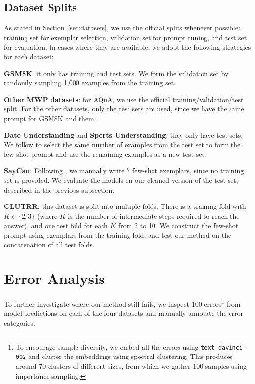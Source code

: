 \documentclass[11pt]{article}
\begin{document}
\subsection{Dataset Splits}
As stated in Section~\ref{sec:datasets}, we use the official splits whenever possible: training set for exemplar selection, validation set for prompt tuning, and test set for evaluation. In cases where they are available, we adopt the following strategies for each dataset:

\textbf{GSM8K}: it only has training and test sets. We form the validation set by randomly sampling 1,000 examples from the training set.

\textbf{Other MWP datasets}: for AQuA, we use the official training/validation/test split. For the other datasets, only the test sets are used, since we have the same prompt for GSM8K and them.

\textbf{Date Understanding} and \textbf{Sports Understanding}: they only have test sets. We follow \citet{wei_chain_2022} to select the same number of examples from the test set to form the few-shot prompt and use the remaining examples as a new test set. 

\textbf{SayCan}: Following \citet{wei_chain_2022}, we manually write 7 few-shot exemplars, since no training set is provided. We evaluate the models on our cleaned version of the test set, described in the previous subsection.

\textbf{CLUTRR}: this dataset is split into multiple folds. There is a training fold with $K \in \{2,3\}$ (where $K$ is the number of intermediate steps required to reach the answer), and one test fold for each $K$ from 2 to 10. We construct the few-shot prompt using exemplars from the training fold, and test our method on the concatenation of all test folds.



\section{Error Analysis}
\label{sec:appendix_error_analysis}
To further investigate where our method still fails, we inspect 100 errors\footnote{To encourage sample diversity, we embed all the errors using \texttt{text-davinci-002} and cluster the embeddings using spectral clustering. This produces around 70 clusters of different sizes, from which we gather 100 samples using importance sampling.} from model predictions on each of the four datasets and manually annotate the error categories.
\end{document}
